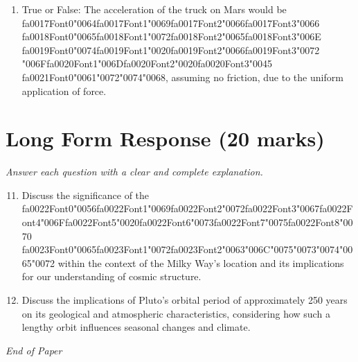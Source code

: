 \documentclass[12pt]{article}
\begin{document}
\begin{enumerate}[label=\arabic*.]
\item True or False: The acceleration of the truck on Mars would be {\csname fa0017Font0\endcsname\char"0064}{\csname fa0017Font1\endcsname\char"0069}{\csname fa0017Font2\endcsname\char"0066}{\csname fa0017Font3\endcsname\char"0066} {\csname fa0018Font0\endcsname\char"0065}{\csname fa0018Font1\endcsname\char"0072}{\csname fa0018Font2\endcsname\char"0065}{\csname fa0018Font3\endcsname\char"006E} {\csname fa0019Font0\endcsname\char"0074}{\csname fa0019Font1\endcsname\char"0020}{\csname fa0019Font2\endcsname\char"0066}{\csname fa0019Font3\endcsname\char"0072} {\char"006F}{\csname fa0020Font1\endcsname\char"006D}{\csname fa0020Font2\endcsname\char"0020}{\csname fa0020Font3\endcsname\char"0045} {\csname fa0021Font0\endcsname\char"0061}{\char"0072}{\char"0074}{\char"0068}, assuming no friction, due to the uniform application of force.
\end{enumerate}

\section*{Long Form Response (20 marks)}
\textit{Answer each question with a clear and complete explanation.}
\begin{enumerate}[label=\arabic*.]
\setcounter{enumi}{10}
\item Discuss the significance of the {\csname fa0022Font0\endcsname\char"0056}{\csname fa0022Font1\endcsname\char"0069}{\csname fa0022Font2\endcsname\char"0072}{\csname fa0022Font3\endcsname\char"0067}{\csname fa0022Font4\endcsname\char"006F}{\csname fa0022Font5\endcsname\char"0020}{\csname fa0022Font6\endcsname\char"0073}{\csname fa0022Font7\endcsname\char"0075}{\csname fa0022Font8\endcsname\char"0070} {\csname fa0023Font0\endcsname\char"0065}{\csname fa0023Font1\endcsname\char"0072}{\csname fa0023Font2\endcsname\char"0063}{\char"006C}{\char"0075}{\char"0073}{\char"0074}{\char"0065}{\char"0072} within the context of the Milky
Way's location and its implications for our understanding of cosmic structure.
\item Discuss the implications of Pluto's orbital period of approximately 250 years on its
geological and atmospheric characteristics, considering how such a lengthy orbit
influences seasonal changes and climate.
\end{enumerate}

\vfill
\noindent\textit{End of Paper}
\end{document}
